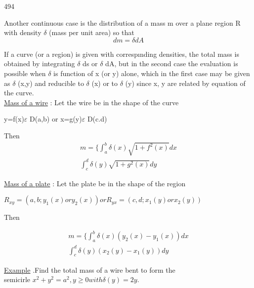 \documentclass{article}
\begin{document}
\begin{center} 494 \end{center} 


Another continuous case is the distribution of a mass m
over a plane region R with density $\delta$ (mass per unit area) so
 that\\
 $$dm=\delta dA$$
 
  If a curve (or a region) is given with correspınding densities, the total mass is obtained by integrating $\delta$ ds or $\delta$ dA, but in the second case the evaluation is possible when $\delta$ is function of x (or y) alone, which in the first case may be given as $\delta$ (x,y) and reducible to $\delta$ (x) or to $\delta$ (y) since x, y are related by equation of the curve.\\
 
  \underline {Mass of a wire} : Let the wire be in the shape of the curve
  
  \centerline {y=f(x)$\varepsilon$ D(a,b) or x=g(y)$\varepsilon$ D(c.d)}
  Then 
  \begin{align*}
      m=\Bigg\{
      \int_{a}^{b} \delta (x) \sqrt{1+f^2(x)} dx \\ \int_{c}^{d} \delta (y) \sqrt{1+g^2(x)} dy
  \end{align*} 


  \underline {Mass of a plate} : Let the plate be in the shape of the region\\
  
  \centerline { $R_{xy} = ( a, b; y_{1} (x) or y_{2} (x) ) or R_{yx} = ( c, d; x_{1} (y) or x_{2} (y) ) $  } 
  
  Then 
  
    \begin{align*}
     m=\Bigg\{
      \int_{a}^{b} \delta (x) ( y_{2} (x)-y_{1} (x) ) dx \\ \int_{c}^{d} \delta (y) ( x_{2} (y)-x_{1} (y)) dy
    \end{align*}
    
   
  \underline {Example} .Find the total mass of a wire bent to form the\\
semicirle $x^2 + y^2 = a^2 , y\geq 0 with \delta (y) = 2y. $
  
\end{document}
